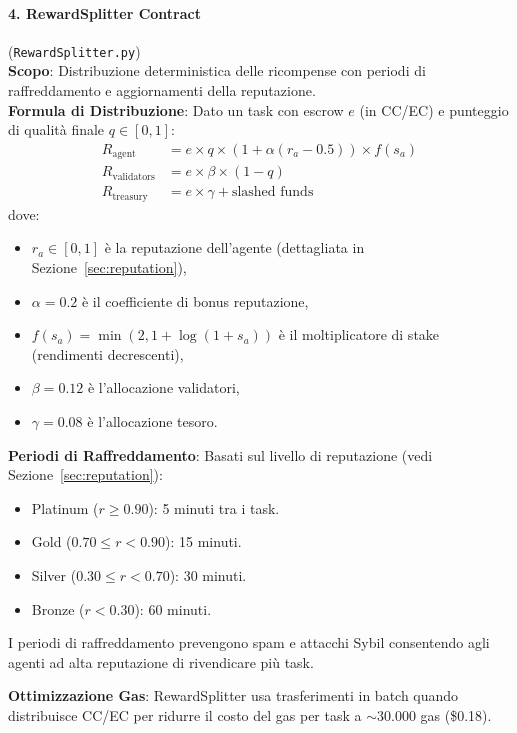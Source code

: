 \documentclass[11pt]{article}
\begin{document}
\paragraph{4. RewardSplitter Contract} (\texttt{RewardSplitter.py})\\
\textbf{Scopo}: Distribuzione deterministica delle ricompense con periodi di raffreddamento e aggiornamenti della reputazione.\\
\textbf{Formula di Distribuzione}: Dato un task con escrow $e$ (in CC/EC) e punteggio di qualità finale $q \in [0,1]$:
\begin{align}
R_{\text{agent}} &= e \times q \times \left(1 + \alpha (r_a - 0.5)\right) \times f(s_a) \label{eq:reward-agent} \\
R_{\text{validators}} &= e \times \beta \times (1-q) \label{eq:reward-validators} \\
R_{\text{treasury}} &= e \times \gamma + \text{slashed funds} \label{eq:reward-treasury}
\end{align}
dove:
\begin{itemize}[noitemsep]
  \item $r_a \in [0,1]$ è la reputazione dell'agente (dettagliata in Sezione~\ref{sec:reputation}),
  \item $\alpha = 0.2$ è il coefficiente di bonus reputazione,
  \item $f(s_a) = \min(2, 1 + \log(1+s_a))$ è il moltiplicatore di stake (rendimenti decrescenti),
  \item $\beta = 0.12$ è l'allocazione validatori,
  \item $\gamma = 0.08$ è l'allocazione tesoro.
\end{itemize}
\textbf{Periodi di Raffreddamento}: Basati sul livello di reputazione (vedi Sezione~\ref{sec:reputation}):
\begin{itemize}[noitemsep]
  \item Platinum ($r \geq 0.90$): 5 minuti tra i task.
  \item Gold ($0.70 \leq r < 0.90$): 15 minuti.
  \item Silver ($0.30 \leq r < 0.70$): 30 minuti.
  \item Bronze ($r < 0.30$): 60 minuti.
\end{itemize}
I periodi di raffreddamento prevengono spam e attacchi Sybil consentendo agli agenti ad alta reputazione di rivendicare più task.

\textbf{Ottimizzazione Gas}: RewardSplitter usa trasferimenti in batch quando distribuisce CC/EC per ridurre il costo del gas per task a $\sim$30.000 gas (\$0.18).
\end{document}
